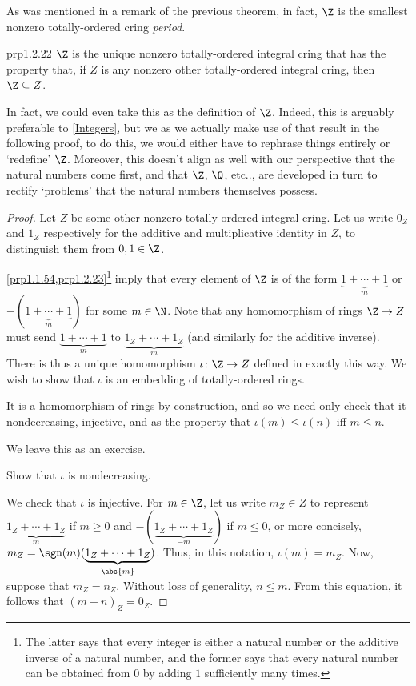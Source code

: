 As was mentioned in a remark of the previous theorem, in fact, $\Z$ is the smallest nonzero totally-ordered cring \emph{period}.
\begin{thm}{}{prp1.2.22}
$\Z$ is the unique nonzero totally-ordered integral cring that has the property that, if $Z$ is any nonzero other totally-ordered integral cring, then $\Z \subseteq Z$.
\begin{rmk}
In fact, we could even take this as the definition of $\Z$.  Indeed, this is arguably preferable to \cref{Integers}, but we as we actually make use of that result in the following proof, to do this, we would either have to rephrase things entirely or `redefine' $\Z$.  Moreover, this doesn't align as well with our perspective that the natural numbers come first, and that $\Z$, $\Q$, etc.., are developed in turn to rectify `problems' that the natural numbers themselves possess.
\end{rmk}
\begin{proof}
Let $Z$ be some other nonzero totally-ordered integral cring.  Let us write $0_Z$ and $1_Z$ respectively for the additive and multiplicative identity in $Z$, to distinguish them from $0,1\in \Z$.

\cref{prp1.1.54,prp1.2.23}\footnote{The latter says that every integer is either a natural number or the additive inverse of a natural number, and the former says that every natural number can be obtained from $0$ by adding $1$ sufficiently many times.} imply that every element of $\Z$ is of the form $\underbrace{1+\cdots +1}_m$ or $-(\underbrace{1+\cdots +1}_m)$ for some $m\in \N$.  Note that any homomorphism of rings $\Z \rightarrow Z$ must send $\underbrace{1+\cdots +1}_m$ to $\underbrace{1_Z+\cdots +1_Z}_m$ (and similarly for the additive inverse).  There is thus a unique homomorphism $\iota \colon \Z \rightarrow Z$ defined in exactly this way.  We wish to show that $\iota$ is an embedding of totally-ordered rings.

It is a homomorphism of rings by construction, and so we need only check that it nondecreasing, injective, and as the property that $\iota (m)\leq \iota (n)$ iff $m\leq n$.

We leave this as an exercise.
\begin{exr}[breakable=false]{}{}
Show that $\iota$ is nondecreasing.
\end{exr}

We check that $\iota$ is injective.  For $m\in \Z$, let us write $m_Z\in Z$ to represent $\underbrace{1_Z+\cdots +1_Z}_m$ if $m\geq 0$ and $-(\underbrace{1_Z+\cdots +1_Z}_{-m})$ if $m\leq 0$, or more concisely, $m_Z=\sgn (m)(\underbrace{1_Z+\cdots +1_Z}_{\abs{m}})$.  Thus, in this notation, $\iota (m)=m_Z$.  Now, suppose that $m_Z=n_Z$.  Without loss of generality, $n\leq m$.  From this equation, it follows that $(m-n)_Z=0_Z$.


\end{proof}
\end{thm}
